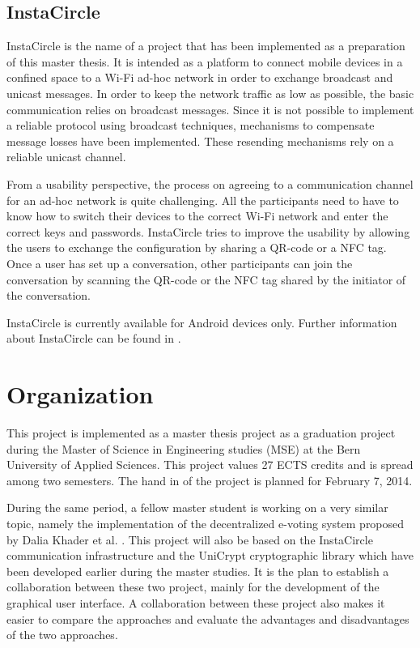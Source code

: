 \documentclass[numbers=noenddot, abstract=on, a4paper, headsepline,
footsepline, oneside, draft=off]{scrreprt}
\begin{document}
\section{InstaCircle}
\label{sec:instacircle}
InstaCircle is the name of a project that has been implemented as a preparation
of this master thesis. It is intended as a platform to connect mobile devices
in a confined space to a Wi-Fi ad-hoc network in order to exchange broadcast
and unicast messages. In order to keep the network traffic as low as possible,
the basic communication relies on broadcast messages. Since it is not possible
to implement a reliable protocol using broadcast techniques, mechanisms to
compensate message losses have been implemented. These resending mechanisms rely
on a reliable unicast channel.

From a usability perspective, the process on agreeing to a communication channel
for an ad-hoc network is quite challenging. All the participants need to have
to know how to switch their devices to the correct Wi-Fi network and enter the
correct keys and passwords. InstaCircle tries to improve the usability by
allowing the users to exchange the configuration by sharing a QR-code or a NFC
tag. Once a user has set up a conversation, other participants can join the
conversation by scanning the QR-code or the NFC tag shared by the initiator of
the conversation.

InstaCircle is currently available for Android devices only. Further information
about InstaCircle can be found in \cite{ritter13a}.



\chapter{Organization}
\label{cha:organization}
This project is implemented as a master thesis project as a graduation project
during the Master of Science in Engineering studies (MSE) at the Bern University
of Applied Sciences. This project values 27 ECTS credits and is spread among two
semesters. The hand in of the project is planned for February 7, 2014.

During the same period, a fellow master student is working on a very similar
topic, namely the implementation of the decentralized e-voting system proposed by
Dalia Khader et al. \cite{HKRS12}. This project will also be based on the
InstaCircle communication infrastructure \cite{ritter13a} and the UniCrypt
cryptographic library \cite{ritter12} which have been developed earlier during
the master studies. It is the plan to establish a collaboration between these
two project, mainly for the development of the graphical user interface. A
collaboration between these project also makes it easier to compare the
approaches and evaluate the advantages and disadvantages of the two approaches.
\end{document}
